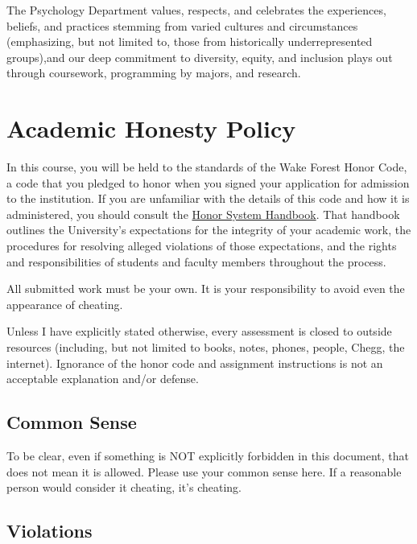 \documentclass[
]{book}
\begin{document}
The Psychology Department values, respects, and celebrates the experiences, beliefs, and practices stemming from varied cultures and circumstances (emphasizing, but not limited to, those from historically underrepresented groups),and our deep commitment to diversity, equity, and inclusion plays out through coursework, programming by majors, and research.

\hypertarget{academic-honesty-policy}{%
\chapter{Academic Honesty Policy}\label{academic-honesty-policy}}

In this course, you will be held to the standards of the Wake Forest Honor Code, a code that you pledged to honor when you signed your application for admission to the institution.
If you are unfamiliar with the details of this code and how it is administered, you should consult the \href{https://studentconduct.wfu.edu/honor-system-wfu/}{Honor System Handbook}.
That handbook outlines the University's expectations for the integrity of your academic work, the procedures for resolving alleged violations of those expectations, and the rights and responsibilities of students and faculty members throughout the process.

All submitted work must be your own. It is your responsibility to avoid even the appearance of cheating.

Unless I have explicitly stated otherwise, every assessment is closed to outside resources (including, but not limited to books, notes, phones, people, Chegg, the internet).
Ignorance of the honor code and assignment instructions is not an acceptable explanation and/or defense.

\hypertarget{common-sense}{%
\section{Common Sense}\label{common-sense}}

To be clear, even if something is NOT explicitly forbidden in this document, that does not mean it is allowed. Please use your common sense here. If a reasonable person would consider it cheating, it's cheating.

\hypertarget{violations}{%
\section{Violations}\label{violations}}
\end{document}
